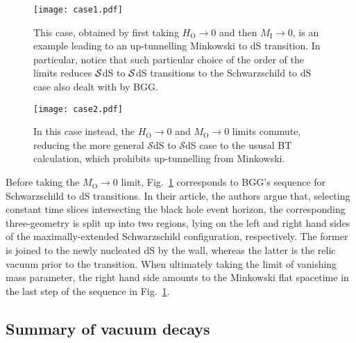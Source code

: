 \documentclass[11pt,a4paper]{article}
\begin{document}
\begin{figure}[h!]  
\centering
\centerline{\texttt{[image: case1.pdf]}} 
\caption{\footnotesize{This case, obtained by first taking $H_{\textrm{O}}\rightarrow 0$ and then $M_{\textrm{I}}\rightarrow 0$, is an example leading to an up-tunnelling Minkowski to dS transition. In particular, notice that such particular choice of the order of the limits reduces ${\cal S}$dS to ${\cal S}$dS transitions to the Schwarzschild to dS case also dealt with by BGG. \label{fig:MIMO}}}
\end{figure}
\begin{figure}[h!]
\centering
\centerline{\texttt{[image: case2.pdf]}}
\caption{\footnotesize{In this case instead, the $H_{\textrm{O}} \rightarrow 0$ and $M_{\textrm{O}} \rightarrow 0$ limits commute, reducing the more general $\mathcal{S}$dS to $\mathcal{S}$dS case to the ususal BT calculation, which prohibits up-tunnelling from Minkowski. \label{fig:MIHO}}}
\end{figure}

\vspace{0.5cm}
Before taking the $M_{\textrm{O}}\rightarrow 0$ limit, Fig.~\ref{fig:MIMO} corresponds to BGG's sequence for Schwarzschild to dS transitions. In their article, the authors argue that, selecting constant time slices intersecting the black hole event horizon, the corresponding three-geometry is split up into two regions, lying on the left and right hand sides of the maximally-extended Schwarzschild configuration, respectively. The former is joined to the newly nucleated dS by the wall, whereas the latter is the relic vacuum prior to the transition. When ultimately taking the limit of vanishing mass parameter, the right hand side amounts to the Minkowski flat spacetime in the last step of the sequence in Fig.~\ref{fig:MIMO}.

\subsection{Summary of vacuum decays}
\end{document}
